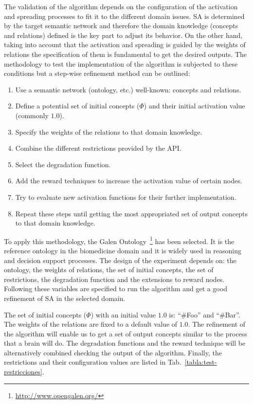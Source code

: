 The validation of the algorithm depends on the configuration of the activation and spreading processes to
fit it to the different domain issues. SA is determined by the target semantic network and therefore
the domain knowledge (concepts and relations) defined is the key part to adjust its behavior. On the other
hand, taking into account that the activation and spreading is guided by the weights of relations the specification
of them is fundamental to get the desired outputs. The methodology to test the implementation
of the algorithm is subjected to these conditions but a step-wise refinement method can be outlined:
\begin{enumerate}
  \item Use a semantic network (ontology, etc.) well-known: concepts and relations.
  \item Define a potential set of initial concepts ($\Phi$) and their initial activation value (commonly $1.0$).
  \item Specify the weights of the relations to that domain knowledge.
  \item Combine the different restrictions provided by the API.
  \item Select the degradation function.
  \item Add the reward techniques to increase the activation value of certain nodes.
  \item Try to evaluate new activation functions for their further implementation.
  \item Repeat these steps until getting the most appropriated set of output concepts to that domain knowledge.
\end{enumerate}

To apply this methodology, the Galen Ontology~\footnote{\url{http://www.opengalen.org/}} has been selected. 
It is the reference ontology in the biomedicine domain and it is widely used in reasoning and decision support processes. 
The design of the experiment depends on: the ontology, the weights of relations, 
the set of initial concepts, the set of restrictions, the degradation function and the extensions to reward nodes.
 Following these variables are specified to run the algorithm and get a good refinement of SA in the selected domain. 

The set of initial concepts ($\Phi$) with an initial value $1.0$ is: ``\#Foo'' and ``\#Bar''. The weights of the 
relations are fixed to a default value of $1.0$. The refinement of the algorithm will enable us to get
a set of output concepts similar to the process that a brain will do. The degradation functions
and the reward technique will be alternatively combined checking the output of the algorithm. Finally, the restrictions 
and their configuration values are listed in Tab.~\ref{tabla:test-restricciones}.

